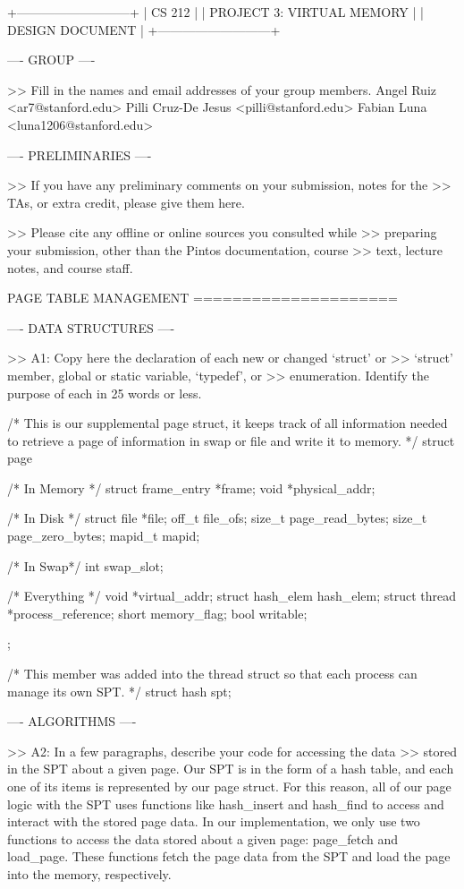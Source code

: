             +---------------------------+
            |          CS 212           |
            | PROJECT 3: VIRTUAL MEMORY |
            |      DESIGN DOCUMENT      |
            +---------------------------+

---- GROUP ----

>> Fill in the names and email addresses of your group members.
Angel Ruiz <ar7@stanford.edu>
Pilli Cruz-De Jesus <pilli@stanford.edu>
Fabian Luna <luna1206@stanford.edu>

---- PRELIMINARIES ----

>> If you have any preliminary comments on your submission, notes for the
>> TAs, or extra credit, please give them here.

>> Please cite any offline or online sources you consulted while
>> preparing your submission, other than the Pintos documentation, course
>> text, lecture notes, and course staff.

            PAGE TABLE MANAGEMENT
            =====================

---- DATA STRUCTURES ----

>> A1: Copy here the declaration of each new or changed `struct' or
>> `struct' member, global or static variable, `typedef', or
>> enumeration.  Identify the purpose of each in 25 words or less.

/* This is our supplemental page struct, it keeps
track of all information needed to retrieve a page
of information in swap or file and write it to memory. */
struct page {
    /* In Memory */
    struct frame_entry *frame;
    void *physical_addr;

    /* In Disk */
    struct file *file;
    off_t file_ofs;
    size_t page_read_bytes;
    size_t page_zero_bytes;
    mapid_t mapid;

    /* In Swap*/
    int swap_slot;

    /* Everything */
    void *virtual_addr;
    struct hash_elem hash_elem;
    struct thread *process_reference;
    short memory_flag;    
    bool writable;
};

/* This member was added into the thread struct so that each 
   process can manage its own SPT. */
struct hash spt;

---- ALGORITHMS ----

>> A2: In a few paragraphs, describe your code for accessing the data
>> stored in the SPT about a given page.
Our SPT is in the form of a hash table, and each one of its items is 
represented by our page struct. For this reason, all of our page logic
with the SPT uses functions like hash_insert and hash_find to access and 
interact with the stored page data. In our implementation, we only use two
functions to access the data stored about a given page: page_fetch and 
load_page. These functions fetch the page data from the SPT and load the 
page into the memory, respectively.

